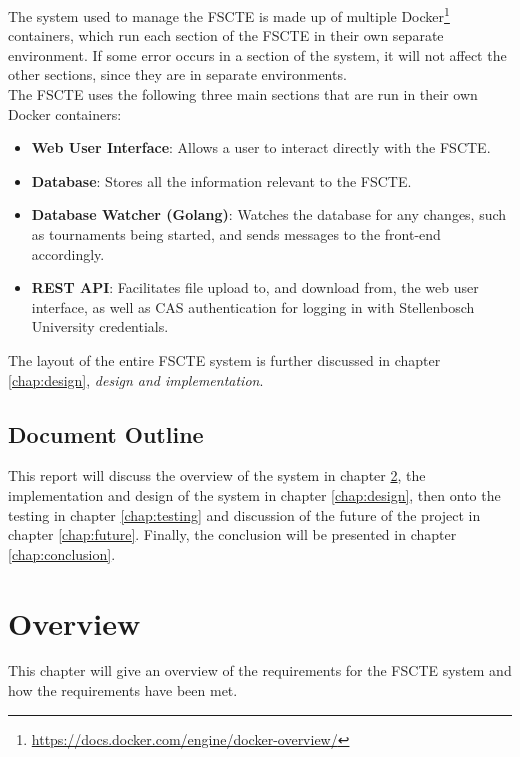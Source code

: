 \documentclass[a4paper, 11pt]{report}
\begin{document}
The system used to manage the FSCTE is made up of multiple Docker\footnote{\url{https://docs.docker.com/engine/docker-overview/}}
containers, which run each section of the FSCTE in their own separate environment.
If some error occurs in a section of the system, it will not affect the other
sections, since they are in separate environments. \\

The FSCTE uses the following three main sections that are run in their own
Docker containers:

\begin{itemize}
	\item \textbf{Web User Interface}: Allows a user to interact directly with
	the FSCTE.
	\item \textbf{Database}: Stores all the information relevant to the FSCTE.
	\item \textbf{Database Watcher (Golang)}: Watches the database for any changes,
	such as tournaments being started, and sends messages to the front-end
	accordingly.
	\item \textbf{REST API}: Facilitates file upload to, and download from, the
	web user interface, as well as CAS authentication for logging in with
	Stellenbosch University credentials.
\end{itemize}

The layout of the entire FSCTE system is further discussed in chapter
\ref{chap:design}, \emph{design and implementation}.

\section{Document Outline}

This report will discuss the overview of the system in chapter \ref{chap:overview},
the implementation and design of the system in chapter \ref{chap:design}, then
onto the testing in chapter \ref{chap:testing} and discussion of the future of
the project in chapter \ref{chap:future}. Finally, the conclusion will be
presented in chapter \ref{chap:conclusion}.

\chapter{Overview}
\label{chap:overview}

This chapter will give an overview of the requirements for the FSCTE system and
how the requirements have been met. \\
\end{document}
